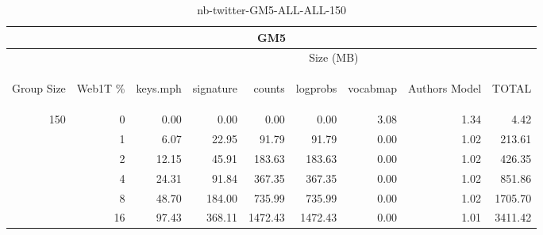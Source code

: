 \begin{center}
\begin{table}[htbp]
\begin{tabular}{ | r | r | r | r | r | r | r | r | r |}
\hline
\multicolumn{9}{|c|}{GM5}\\
\hline
 & & \multicolumn{7}{|c|}{Size (MB)}\\ \cline{3-9}
\begin{sideways}Group Size\end{sideways} & \begin{sideways}Web1T \% \end{sideways} & \begin{sideways}keys.mph\end{sideways} & \begin{sideways}signature\end{sideways} & \begin{sideways}counts\end{sideways} & \begin{sideways}logprobs\end{sideways} & \begin{sideways}vocabmap\end{sideways} & \begin{sideways}Authors Model \end{sideways} & \begin{sideways}TOTAL\end{sideways}\\
\hline
\multirow{5}{*}{150}
 & 0 & 0.00 & 0.00 & 0.00 & 0.00 & 3.08 & 1.34 & 4.42\\ \cline{2-9}
 & 1 & 6.07 & 22.95 & 91.79 & 91.79 & 0.00 & 1.02 & 213.61\\ \cline{2-9}
 & 2 & 12.15 & 45.91 & 183.63 & 183.63 & 0.00 & 1.02 & 426.35\\ \cline{2-9}
 & 4 & 24.31 & 91.84 & 367.35 & 367.35 & 0.00 & 1.02 & 851.86\\ \cline{2-9}
 & 8 & 48.70 & 184.00 & 735.99 & 735.99 & 0.00 & 1.02 & 1705.70\\ \cline{2-9}
 & 16 & 97.43 & 368.11 & 1472.43 & 1472.43 & 0.00 & 1.01 & 3411.42\\ \cline{2-9}
\hline
\end{tabular}
\caption{nb-twitter-GM5-ALL-ALL-150}
\label{table:nb-twitter-GM5-ALL-ALL-150}
\end{table}
\end{center}

